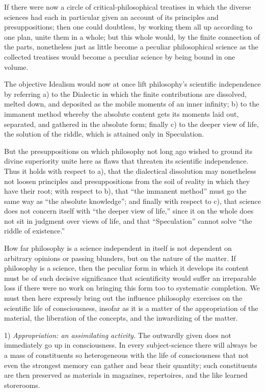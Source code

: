 \documentclass[12pt]{book}
\begin{document}
If there were now a circle of critical-philosophical treatises in which the diverse sciences had each
in particular given an account of its principles and presuppositions; then one could doubtless, by
working them all up according to one plan, unite them in a whole; but this whole would, by the finite
connection of the parts, nonetheless just as little become a peculiar philosophical science as the
collected treatises would become a peculiar science by being bound in one volume.

The objective Idealism would now at once lift philosophy's scientific independence by referring a) to
the Dialectic in which the finite contributions are dissolved, melted down, and deposited as the
mobile moments of an inner infinity; b) to the immanent method whereby the absolute content gets its
moments laid out, separated, and gathered in the absolute form; finally c) to the deeper view of life,
the solution of the riddle, which is attained only in Speculation.

But the presuppositions on which philosophy not long ago wished to ground its divine superiority unite
here as flaws that threaten its scientific independence. Thus it holds with
respect to a), that the dialectical dissolution may nonetheless not loosen principles and
presuppositions from the soil of reality in which they have their root; with respect to b), that ``the
immanent method'' must go the same way as ``the absolute knowledge''; and finally with respect to c),
that science does not concern itself with ``the deeper view of life,'' since it on the whole does not
sit in judgment over views of life, and that ``Speculation'' cannot solve ``the riddle of existence.''

How far philosophy is a science independent in itself is not dependent on arbitrary opinions or passing
blunders, but on the nature of the matter. If philosophy is a science, then the peculiar form in which
it develops its content must be of such decisive significance that scientificity would suffer an
irreparable loss if there were no work on bringing this form too to systematic completion. We must then
here expressly bring out the influence philosophy exercises on the scientific life of consciousness,
insofar as it is a matter of the appropriation of the material, the liberation of the concepts, and the
inwardizing of the matter.

1) \emph{Appropriation: an assimilating activity.} The outwardly given does not immediately go up in
consciousness. In every subject-science there will always be a mass of constituents so heterogeneous
with the life of consciousness that not even the strongest memory can gather and bear their quantity;
such constituents are then preserved as materials in magazines, repertoires, and the like learned
storerooms.
\end{document}
